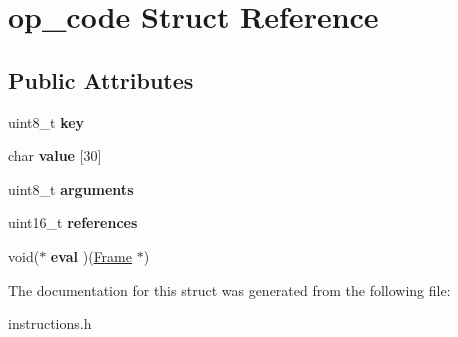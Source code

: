\hypertarget{structop__code}{}\section{op\+\_\+code Struct Reference}
\label{structop__code}
\subsection*{Public Attributes}
\begin{DoxyCompactItemize}
\item 
uint8\+\_\+t {\bfseries key}\hypertarget{structop__code_adfbb2fc6e07e6fda7e392c0b6f6f64b6}{}\label{structop__code_adfbb2fc6e07e6fda7e392c0b6f6f64b6}

\item 
char {\bfseries value} \mbox{[}30\mbox{]}\hypertarget{structop__code_a0b74d91235a8b9f0a36710d68c2746d1}{}\label{structop__code_a0b74d91235a8b9f0a36710d68c2746d1}

\item 
uint8\+\_\+t {\bfseries arguments}\hypertarget{structop__code_ac059fd01f71776bebdc8fcccd44f7476}{}\label{structop__code_ac059fd01f71776bebdc8fcccd44f7476}

\item 
uint16\+\_\+t {\bfseries references}\hypertarget{structop__code_a8d28fff7d91873f58a4a12205dd0f8e0}{}\label{structop__code_a8d28fff7d91873f58a4a12205dd0f8e0}

\item 
void($\ast$ {\bfseries eval} )(\hyperlink{structFrame}{Frame} $\ast$)\hypertarget{structop__code_acd2c8c9ef3e72b9f110127c854620472}{}\label{structop__code_acd2c8c9ef3e72b9f110127c854620472}

\end{DoxyCompactItemize}


The documentation for this struct was generated from the following file\+:\begin{DoxyCompactItemize}
\item 
instructions.\+h\end{DoxyCompactItemize}
